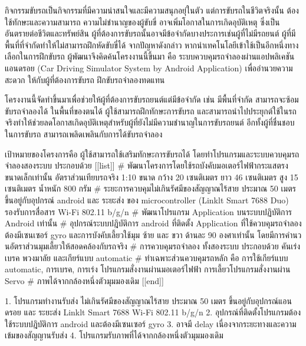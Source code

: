 
    กิจกรรมขับรถเป็นกิจกรรมที่มีความน่าสนใจและมีความสนุกอยุ่ในตัว แต่การขับรถในชีวิตจริงนั้น ต้องใช้ทักษะและความสามารถ ความไม่ชำนาญของผู้ขับขี่  อาจเพิ่มโอกาสในการเกิดอุบัติเหตุ ซึ่งเป็นอันตรายต่อชีวิตและทรัพย์สิน ผู้ที่ต้องการขับรถนั้นอาจมีข้อจำกัดบางประการเช่นผู้ที่ไม่มีรถยนต์ ผู้ที่มีพื้นที่ที่จำกัดทำให้ไม่สามารถฝึกหัดขับขี่ได้ 
    จากปัญหาดังกล่าว หากนำเทคโนโลยีเข้าใช้เป็นอีกหนึ่งทางเลือกในการฝึกขับรถ ผู้พัฒนาจึงคิดค้นโครงงานนี้ขึ้นมา คือ ระบบควบคุมรถจำลองผ่านแอปพลิเคชันแอนดรอย (Car Driving Simulator System by Android Application) เพื่ออำนวยความสะดวก ให้กับผู้ที่ต้องการขับรถ ฝึกขับรถจำลองทดแทน 



    โครงงานนี้จัดทำขึ้นมาเพื่อช่วยให้ผู้ที่ต้องการขับรถยนต์แต่มีข้อจำกัด  เช่น มีพื้นที่จำกัด  สามารถจะซ้อมขับรถจำลองได้ ในพื้นที่ของตนได้ ผู้ใช้สามารถฝึกทักษะการขับรถ และสามารถนำไปประยุกต์ใช้ในรถจริงทำให้ช่วยลดโอกาสเกิดอุบัติเหตุสำหรับผู้ที่ยังไม่มีความชำนาญในการขับรถยนต์  อีกทั้งผู้ที่ชื่นชอบในการขับรถ สามารถเพลิดเพลินกับการได้ขับรถจำลอง

    เป้าหมายของโครงการคือ ผู้ใช้สามารถใช้เสริมทักษะการขับรถได้ โดยทำโปรแกรมและระบบควบคุมรถจำลองสองระบบ ประกอบด้วย
    [[list]]
        # พัฒนาโครงการโดยใช้รถบังคับมอเตอร์ไฟฟ้ากระแสตรงขนาดเล็กเท่านั้น อัตราส่วนเทียบรถจริง 1:10  ขนาด กว้าง 20 เซนติเมตร  ยาว 46 เซนติเมตร สูง 15 เซนติเมตร น้ำหนัก 800 กรัม
        # ระยะการควบคุมไม่เกินรัศมีของสัญญาณไร้สาย ประมาณ 50 เมตร ขึ้นอยู่กับอุปกรณ์ android และ ระยะส่ง ของ microcontroller (Linklt Smart 7688 Duo) รองรับการสื่อสาร Wi-Fi 802.11 b/g/n
        # พัฒนาโปรแกรม Application บนระบบปฏิบัติการ Android  เท่านั้น
        # อุปกรณ์ระบบปฎิบัติการ android ที่ติดตั้ง Application ที่ใช้ควบคุมรถจำลองต้องมีเซนเซอร์ gyro และการบังคับเลี้ยวใช้มุม ซ้าย และ ขวา ด้านละ 90 องศาเท่านั้น โดยมีการคำนวนอัตราส่วนมุมเลี้ยวให้สอดคล้องกับรถจริง
        # การควบคุมรถจำลอง ทั้งสองระบบ ประกอบด้วย คันเร่ง เบรค พวงมาลัย และเกียร์แบบ automatic
        # ทำเฉพาะส่วนควบคุมรถหลัก คือ การใช้เกียร์แบบ automatic, การเบรค, การเร่ง โปรแกรมสั่งงานผ่านมอเตอร์ไฟฟ้า  การเลี้ยวโปรแกรมสั่งงานผ่าน Servo
        # ภาพได้จากกล้องหนึ่งตัวมุมมองเดิม
    [[end]]

    1. โปรแกรมทำงานรับส่ง ไม่เกินรัศมีของสัญญาณไร้สาย ประมาณ 50 เมตร ขึ้นอยู่กับอุปกรณ์แอนดรอย และ ระยะส่ง Linklt Smart 7688 Wi-Fi 802.11 b/g/n
    2. อุปกรณ์ที่ติดตั้งโปรแกรมต้องใช้ระบบปฎิบัติการ android และต้องมีเซนเซอร์ gyro 
    3. อาจมี delay เนื่องจากระยะทางและความเข้มของสัญญานรับส่ง
    4. โปรแกรมรับภาพที่ได้จากกล้องหนึ่งตัวมุมมองเดิม

